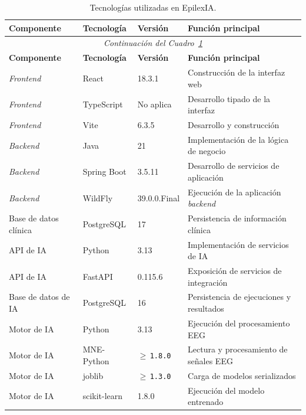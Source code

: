\begin{longtable}{|
p{0.18\dimexpr\textwidth-8\tabcolsep-5\arrayrulewidth\relax}|
p{0.19\dimexpr\textwidth-8\tabcolsep-5\arrayrulewidth\relax}|
p{0.18\dimexpr\textwidth-8\tabcolsep-5\arrayrulewidth\relax}|
p{0.45\dimexpr\textwidth-8\tabcolsep-5\arrayrulewidth\relax}|}

\caption[Principales tecnologías utilizadas en EpilexIA]%
{Tecnologías utilizadas en EpilexIA.}
\label{tab:tecnologias_epilexia}\\
\hline
\textbf{Componente} &
\textbf{Tecnología} &
\textbf{Versión} &
\textbf{Función principal} \\
\hline
\endfirsthead

\multicolumn{4}{c}{\textit{Continuación del Cuadro~\ref{tab:tecnologias_epilexia}}}\\
\hline
\textbf{Componente} &
\textbf{Tecnología} &
\textbf{Versión} &
\textbf{Función principal} \\
\hline
\endhead

\textit{Frontend} & React & 18.3.1 &
Construcción de la interfaz web \\
\hline
\textit{Frontend} & TypeScript & No aplica &
Desarrollo tipado de la interfaz \\
\hline
\textit{Frontend} & Vite & 6.3.5 &
Desarrollo y construcción \\
\hline
\textit{Backend} & Java & 21 &
Implementación de la lógica de negocio \\
\hline
\textit{Backend} & Spring Boot & 3.5.11 &
Desarrollo de servicios de aplicación \\
\hline
\textit{Backend} & WildFly & 39.0.0.Final &
Ejecución de la aplicación \textit{backend} \\
\hline
Base de datos clínica & PostgreSQL & 17 &
Persistencia de información clínica \\
\hline
API de IA & Python & 3.13 &
Implementación de servicios de IA \\
\hline
API de IA & FastAPI & 0.115.6 &
Exposición de servicios de integración \\
\hline
Base de datos de IA & PostgreSQL & 16 &
Persistencia de ejecuciones y resultados \\
\hline
Motor de IA & Python & 3.13 &
Ejecución del procesamiento EEG \\
\hline
Motor de IA & MNE-Python & $\geq$\,\texttt{1.8.0} &
Lectura y procesamiento de señales EEG \\
\hline
Motor de IA & joblib & $\geq$\,\texttt{1.3.0} &
Carga de modelos serializados \\
\hline
Motor de IA & scikit-learn & 1.8.0 &
Ejecución del modelo entrenado \\
\hline

\end{longtable}
\endgroup

